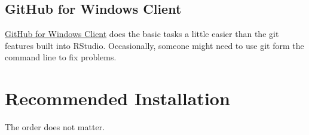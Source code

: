 \documentclass[]{book}
\begin{document}
\hypertarget{github-for-windows-client}{%
\subsection{GitHub for Windows Client}\label{github-for-windows-client}}

\href{http://windows.github.com/}{GitHub for Windows Client} does the basic tasks a little easier than the git features built into RStudio. Occasionally, someone might need to use git form the command line to fix problems.

\hypertarget{installation-recommended}{%
\section{Recommended Installation}\label{installation-recommended}}

The order does not matter.
\end{document}
